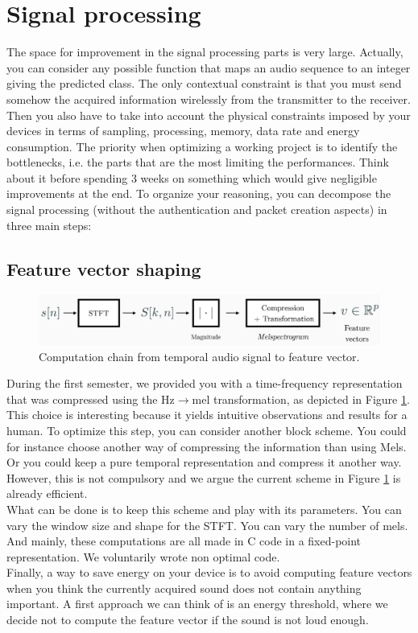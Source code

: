 \section{Signal processing}
The space for improvement in the signal processing parts is very large.
Actually, you can consider any possible function that maps an audio sequence to an integer giving the predicted class. The only contextual constraint is that you must send somehow the acquired information wirelessly from the transmitter to the receiver. Then you also have to take into account the physical constraints imposed by your devices in terms of sampling, processing, memory, data rate and energy consumption. The priority when optimizing a working project is to identify the bottlenecks, i.e. the parts that are the most limiting the performances. Think about it before spending 3 weeks on something which would give negligible improvements at the end. To organize your reasoning, you can decompose the signal processing (without the authentication and packet creation aspects) in three main steps:

\subsection{Feature vector shaping}

\begin{figure}[H]
    \centering
    \includegraphics[width=14cm]{figs/scheme.PNG}
    \caption{Computation chain from temporal audio signal to feature vector.}
    \label{fig: fv}
\end{figure}
During the first semester, we provided you with a time-frequency representation that was compressed using the Hz$\rightarrow$mel transformation, as depicted in Figure \ref{fig: fv}. This choice is interesting because it yields intuitive observations and results for a human. To optimize this step, you can consider another block scheme. You could for instance choose another way of compressing the information than using Mels. Or you could keep a pure temporal representation and compress it another way.
However, this is not compulsory and we argue the current scheme in Figure \ref{fig: fv} is already efficient. \\
What can be done is to keep this scheme and play with its parameters. You can vary the window size and shape for the STFT. You can vary the number of mels. And mainly, these computations are all made in C code in a fixed-point representation. We voluntarily wrote non optimal code. \\
Finally, a way to save energy on your device is to avoid computing feature vectors when you think the currently acquired sound does not contain anything important. A first approach we can think of is an energy threshold, where we decide not to compute the feature vector if the sound is not loud enough.

